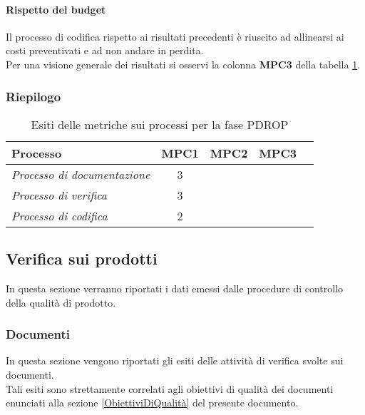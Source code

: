 \documentclass[../PianoDiQualifica.tex]{subfiles}
\begin{document}
\begin{appendices}
			\paragraph{Rispetto del budget}
			Il processo di codifica rispetto ai risultati precedenti è riuscito ad allinearsi ai costi preventivati e ad non andare in perdita.\\
			Per una visione generale dei risultati si osservi la colonna \textbf{MPC3}  della tabella \ref{tab:esiti_metriche_processi}.
			
			\subsubsection{Riepilogo}
			
			\begin{table}[H]
				\centering
				\begin{tabular}{l * {4}{c}}
					\toprule
					\textbf{Processo} & \textbf{MPC1} & \textbf{MPC2} & \textbf{MPC3} \\
					\midrule
					\textit{Processo di documentazione} & 3 & \color{dkgreen}{0\%} &  \color{dkgreen}{0\%} \\
					\textit{Processo di verifica} & 3 & \color{dkgreen}{0\%} &  \color{dkgreen}{0\%} \\
					\textit{Processo di codifica} & 2 & \color{dkgreen}{0\%} &  \color{dkgreen}{0\%} \\
					\bottomrule
				\end{tabular}
				\caption{Esiti delle metriche sui processi per la fase PDROP}
				\label{tab:esiti_metriche_processi}
			\end{table}
			
			
	\subsection{Verifica sui prodotti}
	In questa sezione verranno riportati i dati emessi dalle procedure di controllo della qualità di prodotto\g.
	
		\subsubsection{Documenti}
		In questa sezione vengono riportati gli esiti delle attività di verifica svolte sui documenti.\\
		Tali esiti sono strettamente correlati agli obiettivi di qualità dei documenti enunciati alla sezione \ref{ObiettiviDiQualità} del presente documento.
			

\end{appendices}
\end{document}
